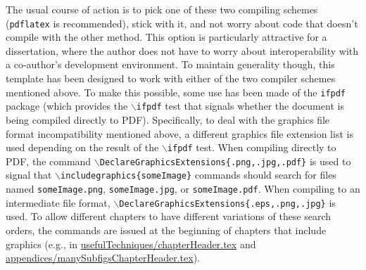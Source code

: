 The usual course of action is to pick one of these two compiling schemes (\texttt{pdflatex} is recommended), stick with it, and not worry about code that doesn't compile with the other method.
This option is particularly attractive for a dissertation, where the author does not have to worry about interoperability with a co-author's development environment.
To maintain generality though, this template has been designed to work with either of the two compiler schemes mentioned above.
To make this possible, some use has been made of the \texttt{ifpdf} package (which provides the $\backslash$\texttt{ifpdf} test that signals whether the document is being compiled directly to PDF).
Specifically, to deal with the graphics file format incompatibility mentioned above, a different graphics file extension list is used depending on the result of the $\backslash$\texttt{ifpdf} test.
When compiling directly to PDF, the command $\backslash$\texttt{DeclareGraphicsExtensions\{.png,.jpg,.pdf\}} is used to signal that $\backslash$\texttt{includegraphics\{someImage\}} commands should search for files named \texttt{someImage.png}, \texttt{someImage.jpg}, or \texttt{someImage.pdf}.
When compiling to an intermediate file format, $\backslash$\texttt{DeclareGraphicsExtensions\{.eps,.png,.jpg\}} is used.
To allow different chapters to have different variations of these search orders, the commands are issued at the beginning of chapters that include graphics (e.g., in \href{./usefulTechniques/chapterHeader.tex}{usefulTechniques/chapterHeader.tex} and \href{./appendices/manySubfigsChapterHeader.tex}{appendices/many\-SubfigsChapterHeader.tex}). 